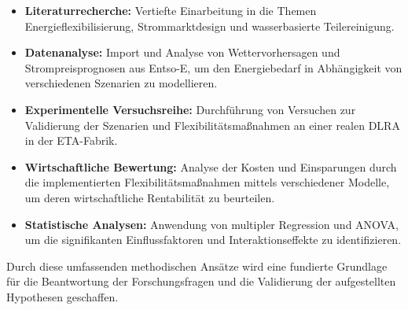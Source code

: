 \begin{itemize}[label={--}]
	\item \textbf{Literaturrecherche:} Vertiefte Einarbeitung in die Themen Energieflexibilisierung, Strommarktdesign und wasserbasierte Teilereinigung.
	\item \textbf{Datenanalyse:} Import und Analyse von Wettervorhersagen und Strompreisprognosen aus Entso-E, um den Energiebedarf in Abhängigkeit von verschiedenen Szenarien zu modellieren.
	\item \textbf{Experimentelle Versuchsreihe:} Durchführung von Versuchen zur Validierung der Szenarien und Flexibilitätsmaßnahmen an einer realen DLRA in der ETA-Fabrik.
	\item \textbf{Wirtschaftliche Bewertung:} Analyse der Kosten und Einsparungen durch die implementierten Flexibilitätsmaßnahmen mittels verschiedener Modelle, um deren wirtschaftliche Rentabilität zu beurteilen.
	\item \textbf{Statistische Analysen:} Anwendung von multipler Regression und ANOVA, um die signifikanten Einflussfaktoren und Interaktionseffekte zu identifizieren.
\end{itemize}

Durch diese umfassenden methodischen Ansätze wird eine fundierte Grundlage für die Beantwortung der Forschungsfragen und die Validierung der aufgestellten Hypothesen geschaffen.
